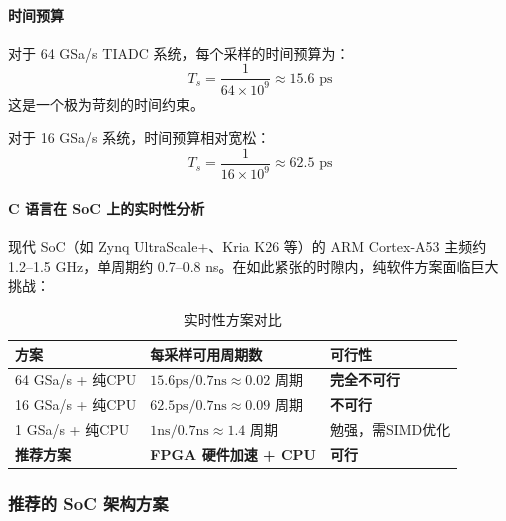 \documentclass[UTF8,a4paper,11pt]{ctexart}
\begin{document}
\paragraph{时间预算}

对于 64 GSa/s TIADC 系统，每个采样的时间预算为：
\begin{equation}
    T_s = \frac{1}{64 \times 10^9} \approx 15.6 \text{ ps}
\end{equation}
这是一个极为苛刻的时间约束。

对于 16 GSa/s 系统，时间预算相对宽松：
\begin{equation}
    T_s = \frac{1}{16 \times 10^9} \approx 62.5 \text{ ps}
\end{equation}

\paragraph{C 语言在 SoC 上的实时性分析}

现代 SoC（如 Zynq UltraScale+、Kria K26 等）的 ARM Cortex-A53 主频约 1.2–1.5 GHz，单周期约 0.7–0.8 ns。在如此紧张的时隙内，纯软件方案面临巨大挑战：

\begin{table}[ht]
\centering
\caption{实时性方案对比}
\begin{tabular}{p{3.5cm}p{3.5cm}p{4cm}}
\toprule
\textbf{方案} & \textbf{每采样可用周期数} & \textbf{可行性} \\
\midrule
64 GSa/s + 纯CPU & $15.6\text{ps} / 0.7\text{ns} \approx 0.02$ 周期 & \textbf{完全不可行} \\
16 GSa/s + 纯CPU & $62.5\text{ps} / 0.7\text{ns} \approx 0.09$ 周期 & \textbf{不可行} \\
1 GSa/s + 纯CPU & $1\text{ns} / 0.7\text{ns} \approx 1.4$ 周期 & 勉强，需SIMD优化 \\
\textbf{推荐方案} & \textbf{FPGA 硬件加速 + CPU} & \textbf{可行} \\
\bottomrule
\end{tabular}
\end{table}

\subsubsection{推荐的 SoC 架构方案}
\end{document}
